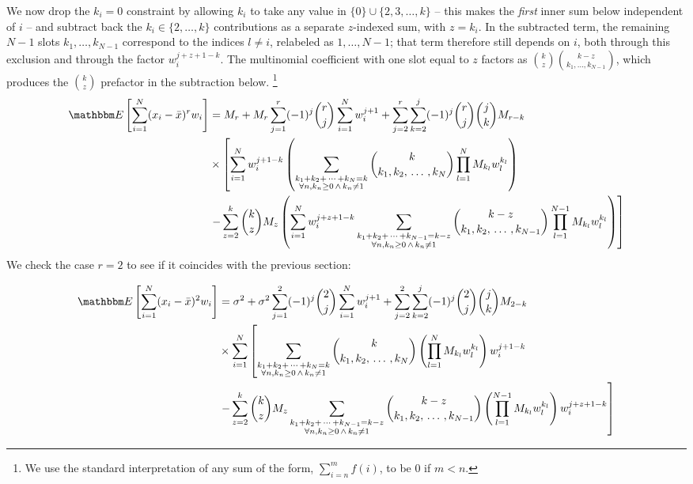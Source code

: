 \documentclass{article}
\newcommand{\E}[1]{\mathbbm E\left[#1\right]}
\begin{document}
We now drop the $k_i = 0$ constraint by allowing $k_i$ to take any value in
$\{0\} \cup \{2, 3, \ldots, k\}$ -- this makes the {\em first\/} inner sum below
independent of $i$ -- and subtract back the $k_i \in \{2, \ldots, k\}$
contributions as a separate $z$-indexed sum, with $z = k_i$. In the subtracted
term, the remaining $N-1$ slots $k_1, \ldots, k_{N-1}$ correspond to the
indices $l \neq i$, relabeled as $1, \ldots, N-1$; that term therefore still
depends on $i$, both through this exclusion and through the factor
$w_i^{j+z+1-k}$. The multinomial coefficient with one slot equal to $z$ factors as
$\binom{k}{z}\binom{k-z}{k_1, \ldots, k_{N-1}}$, which produces the $\binom{k}{z}$
prefactor in the subtraction below.%
\footnote{We use the standard interpretation of any sum of the form, $\sum_{i=n}^m f(i)$, to be $0$ if $m < n$.}
\begin{align}
    \E{\sum_{i=1}^N (x_i - {\bar x})^r w_i} &= M_r + M_r \sum_{j=1}^r  (-1)^j \binom{r}{j} \sum_{i=1}^N w_i^{j+1}
    + \sum_{j=2}^r \sum_{k=2}^j (-1)^j \binom{r}{j} \binom{j}{k} M_{r-k} \\\nonumber
     & \times \left[ \sum_{i=1}^N w_i^{j+1-k} \left( \sum_{\substack{k_1 + k_2 + \, \cdots\,  + k_N = k \\ \forall n, k_n \ge 0 \, \wedge \, k_n \neq 1 }} \binom{k}{k_1, k_2, \, \ldots\, , k_N}
     \prod_{l=1}^N M_{k_l} w_l^{k_l}\right) \right. \\\nonumber
     &\left. - \sum_{z = 2}^k \binom{k}{z} M_z \left( \sum_{i=1}^N w_i^{j+z+1-k} \sum_{\substack{k_1 + k_2 + \, \cdots\, + k_{N-1} = k-z \\ \forall n, k_n \ge 0\, \wedge\, k_n \neq 1}}
     \binom{k-z}{k_1, k_2, \,\ldots\, , k_{N-1}} \prod_{l=1}^{N-1} M_{k_l} w_l^{k_l} \right) \right]
\end{align}
We check the case $r=2$ to see if it coincides with the previous section:

\begin{align}
    \E{\sum_{i=1}^N (x_i - {\bar x})^2 w_i} &= \sigma^2 + \sigma^2 \sum_{j=1}^2  (-1)^j \binom{2}{j} \sum_{i=1}^N w_i^{j+1} 
    +  \sum_{j=2}^2 \sum_{k=2}^j (-1)^j \binom{2}{j} \binom{j}{k} M_{2-k} \\\nonumber 
     & \times \sum_{i=1}^N \left[ \sum_{\substack{k_1 + k_2 + \, \cdots\, + k_N = k \\ \forall n, k_n \ge 0 \, \wedge \, k_n \neq 1 }} \binom{k}{k_1, k_2, \, \ldots\, , k_N} 
     \left(\prod_{l=1}^N M_{k_l} w_l^{k_l}\right) w_i^{j+1-k}  \right. \\\nonumber
     &\left. - \sum_{z = 2}^k \binom{k}{z} M_z \sum_{\substack{k_1 + k_2 +\, \cdots\, + k_{N-1} = k-z \\ \forall n, k_n \ge 0\, \wedge\, k_n \neq 1}}
     \binom{k-z}{k_1, k_2, \, \ldots\, , k_{N-1}} \left(\prod_{l=1}^{N-1} M_{k_l} w_l^{k_l} \right)  w_i^{j+z+1-k} \right]
\end{align}
\end{document}
